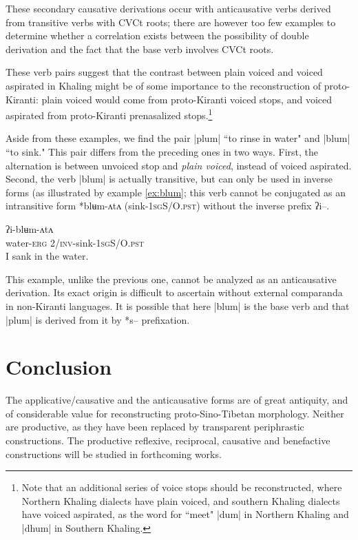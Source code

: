 \documentclass[oldfontcommands,oneside,a4paper,11pt]{article}
\newcommand{\ipa}[1]{{\phon #1}} %
\newcommand{\dhatu}[1]{|\ipa{#1}|}
\begin{document}
These secondary causative derivations occur with anticausative verbs derived from transitive verbs with CVCt roots; there are however too few examples to determine whether a correlation exists between the possibility of double derivation and the fact that the base verb involves CVCt roots.

These verb pairs suggest that the contrast between plain voiced and voiced aspirated in Khaling might be of some importance to the reconstruction of proto-Kiranti: plain voiced would come from proto-Kiranti voiced stops, and voiced aspirated from proto-Kiranti prenasalized stops.\footnote{Note that an additional series of voice stops should be reconstructed, where Northern Khaling dialects have plain voiced, and southern Khaling dialects have voiced aspirated, as the word for ``meet" \dhatu{dum} in Northern Khaling and \dhatu{dhum} in Southern Khaling.}


Aside from these examples, we find the pair \dhatu{plum} ``to rinse in water" and \dhatu{blum} ``to sink." This pair differs from the preceding ones in two ways. First, the alternation is between unvoiced stop and\textit{ plain voiced}, instead of voiced aspirated. Second, the verb \dhatu{blum} is actually transitive, but can only be used in inverse forms (as illustrated by example \ref{ex:blum}; this verb cannot be conjugated as an intransitive form *\ipa{blʉm-ʌtʌ} (sink-\textsc{1sgS/O.pst}) without the inverse prefix \ipa{ʔi--}.

\begin{exe}
\ex \label{ex:blum}
\gll \ipa{ku-ʔɛ} \ipa{ʔi-blʉm-ʌtʌ}\\
water-\textsc{erg} \textsc{2/inv}-sink-\textsc{1sgS/O.pst} \\
\glt I sank in the water.
\end{exe}

 
This example, unlike the previous one, cannot be analyzed as an anticausative derivation. Its exact origin is difficult to ascertain without external comparanda in non-Kiranti languages. It is possible that here \dhatu{blum} is the base verb and that \dhatu{plum} is derived from it by *s-- prefixation.
 


\section{Conclusion}
The applicative/causative and the anticausative forms are of great antiquity, and of considerable value for reconstructing  proto-Sino-Tibetan morphology. Neither are productive, as they have been replaced by transparent periphrastic constructions. The productive reflexive, reciprocal, causative and benefactive constructions will be studied in forthcoming works.






\end{document}
